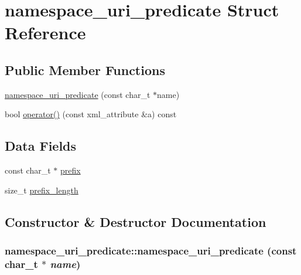 \hypertarget{structnamespace__uri__predicate}{
\section{namespace\_\-uri\_\-predicate Struct Reference}
\label{structnamespace__uri__predicate}
}
\subsection*{Public Member Functions}
\begin{CompactItemize}
\item 
\hyperlink{structnamespace__uri__predicate_25bef9c1e12b0fdc908275ae7ab7c202}{namespace\_\-uri\_\-predicate} (const char\_\-t $\ast$name)
\item 
bool \hyperlink{structnamespace__uri__predicate_b4580e45d603d3eedfe75fec74210ce1}{operator()} (const xml\_\-attribute \&a) const 
\end{CompactItemize}
\subsection*{Data Fields}
\begin{CompactItemize}
\item 
const char\_\-t $\ast$ \hyperlink{structnamespace__uri__predicate_80a2c051b9e57b8895c28d8fcc32e051}{prefix}
\item 
size\_\-t \hyperlink{structnamespace__uri__predicate_a48279192e8d48b9c798f5485a2a9170}{prefix\_\-length}
\end{CompactItemize}


\subsection{Constructor \& Destructor Documentation}
\hypertarget{structnamespace__uri__predicate_25bef9c1e12b0fdc908275ae7ab7c202}{
\subsubsection[namespace\_\-uri\_\-predicate]{\setlength{\rightskip}{0pt plus 5cm}namespace\_\-uri\_\-predicate::namespace\_\-uri\_\-predicate (const char\_\-t $\ast$ {\em name})}}
\label{structnamespace__uri__predicate_25bef9c1e12b0fdc908275ae7ab7c202}




